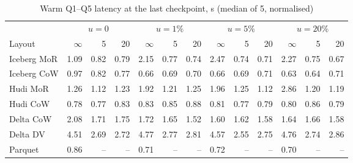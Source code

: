 \begin{table}[!t]\centering
\caption{Warm Q1--Q5 latency at the last checkpoint, s (median of 5, normalised)}\label{tab:a-read}
\footnotesize
\begin{tabular}{@{}lrrrrrrrrrrrr@{}}\toprule
 & \multicolumn{3}{c}{$u=0$} & \multicolumn{3}{c}{$u=1\%$} & \multicolumn{3}{c}{$u=5\%$} & \multicolumn{3}{c}{$u=20\%$}\\
\cmidrule(lr){2-4}\cmidrule(lr){5-7}\cmidrule(lr){8-10}\cmidrule(lr){11-13}
Layout & $\infty$ & 5 & 20 & $\infty$ & 5 & 20 & $\infty$ & 5 & 20 & $\infty$ & 5 & 20\\\midrule
Iceberg MoR & 1.09 & 0.82 & 0.79 & 2.15 & 0.77 & 0.74 & 2.47 & 0.74 & 0.71 & 2.27 & 0.75 & 0.67\\
Iceberg CoW & 0.97 & 0.82 & 0.77 & 0.66 & 0.69 & 0.70 & 0.66 & 0.69 & 0.71 & 0.63 & 0.64 & 0.71\\
Hudi MoR & 1.26 & 1.12 & 1.23 & 1.92 & 1.21 & 1.25 & 1.96 & 1.25 & 1.12 & 2.86 & 1.20 & 1.19\\
Hudi CoW & 0.78 & 0.77 & 0.83 & 0.83 & 0.85 & 0.88 & 0.81 & 0.77 & 0.79 & 0.80 & 0.86 & 0.79\\
Delta CoW & 2.08 & 1.71 & 1.75 & 1.72 & 1.65 & 1.52 & 1.60 & 1.62 & 1.58 & 1.64 & 1.66 & 1.58\\
Delta DV & 4.51 & 2.69 & 2.72 & 4.77 & 2.77 & 2.81 & 4.57 & 2.55 & 2.75 & 4.76 & 2.74 & 2.86\\
Parquet & 0.86 & -- & -- & 0.71 & -- & -- & 0.72 & -- & -- & 0.70 & -- & --\\\bottomrule
\end{tabular}
\end{table}

